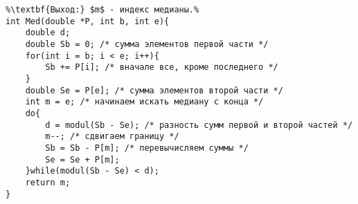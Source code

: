 \begin{lstlisting}[escapechar=\%]
%\noindent\textbf{Вход:} $b$ - индекс начала обрабатываемой части массива $P$, $e$ - индукс конца обрабатываемой части массива $P$.\\%
%\textbf{Выход:} $m$ - индекс медианы.%
int Med(double *P, int b, int e){
	double d;
	double Sb = 0; /* сумма элементов первой части */
	for(int i = b; i < e; i++){
		Sb += P[i]; /* вначале все, кроме последнего */
	}
	double Se = P[e]; /* сумма элементов второй части */
	int m = e; /* начинаем искать медиану с конца */
	do{
		d = modul(Sb - Se); /* разность сумм первой и второй частей */
		m--; /* сдвигаем границу */
		Sb = Sb - P[m]; /* перевычисляем суммы */
		Se = Se + P[m];
	}while(modul(Sb - Se) < d);
	return m;
}
\end{lstlisting}
